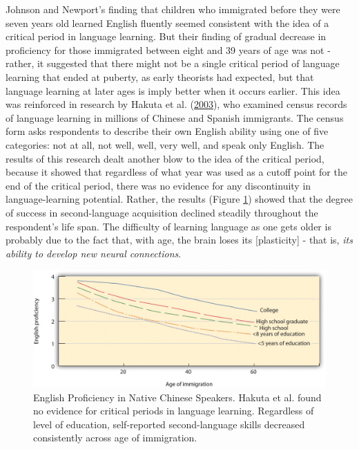 \documentclass[
]{krantz}
\begin{document}
Johnson and Newport's finding that children who immigrated before they were seven years old learned English fluently seemed consistent with the idea of a critical period in language learning. But their finding of gradual decrease in proficiency for those immigrated between eight and 39 years of age was not - rather, it suggested that there might not be a single critical period of language learning that ended at puberty, as early theorists had expected, but that language learning at later ages is imply better when it occurs earlier. This idea was reinforced in research by Hakuta et al. (\protect\hyperlink{ref-Hakuta2003}{2003}), who examined census records of language learning in millions of Chinese and Spanish immigrants. The census form asks respondents to describe their own English ability using one of five categories: not at all, not well, well, very well, and speak only English. The results of this research dealt another blow to the idea of the critical period, because it showed that regardless of what year was used as a cutoff point for the end of the critical period, there was no evidence for any discontinuity in language-learning potential. Rather, the results (Figure \ref{fig:languagelearning}) showed that the degree of success in second-language acquisition declined steadily throughout the respondent's life span. The difficulty of learning language as one gets older is probably due to the fact that, with age, the brain loses its {[}plasticity{]} - that is, \emph{its ability to develop new neural connections}.

\begin{figure}

{\centering \includegraphics[width=0.9\linewidth]{images/ch8/fig3} 

}

\caption{English Proficiency in Native Chinese Speakers. Hakuta et al. found no evidence for critical periods in language learning. Regardless of level of education, self-reported second-language skills decreased consistently across age of immigration.}\label{fig:languagelearning}
\end{figure}
\end{document}
